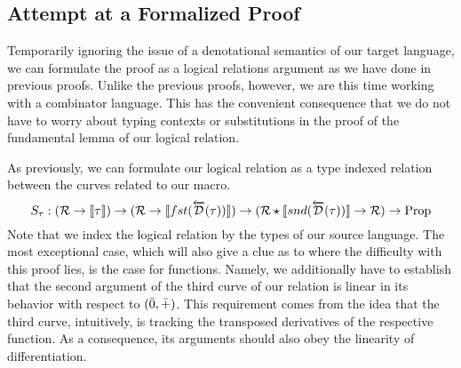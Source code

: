 \subsection{Attempt at a Formalized Proof}\label{sec:combinator-proof}
  Temporarily ignoring the issue of a denotational semantics of our target language, we can formulate the proof as a logical relations argument as we have done in previous proofs.
  Unlike the previous proofs, however, we are this time working with a combinator language.
  This has the convenient consequence that we do not have to worry about typing contexts or substitutions in the proof of the fundamental lemma of our logical relation.

  As previously, we can formulate our logical relation as a type indexed relation between the curves related to our macro.
  \begin{equation*}
    S_\tau : (\mathcal{R} \rightarrow \llbracket \tau \rrbracket) \rightarrow
      (\mathcal{R} \rightarrow \llbracket fst (\overleftarrow{\mathcal{D}}(\tau)) \rrbracket) \rightarrow
      (\mathcal{R} \star \llbracket snd(\overleftarrow{\mathcal{D}}(\tau)) \rrbracket \rightarrow \mathcal{R}) \rightarrow \text{Prop}
  \end{equation*}
  Note that we index the logical relation by the types of our source language.
  The most exceptional case, which will also give a clue as to where the difficulty with this proof lies, is the case for functions.
  Namely, we additionally have to establish that the second argument of the third curve of our relation is linear in its behavior with respect to $(\bar{0}, \bar{+})$.
  This requirement comes from the idea that the third curve, intuitively, is tracking the transposed derivatives of the respective function.
  As a consequence, its arguments should also obey the linearity of differentiation.

